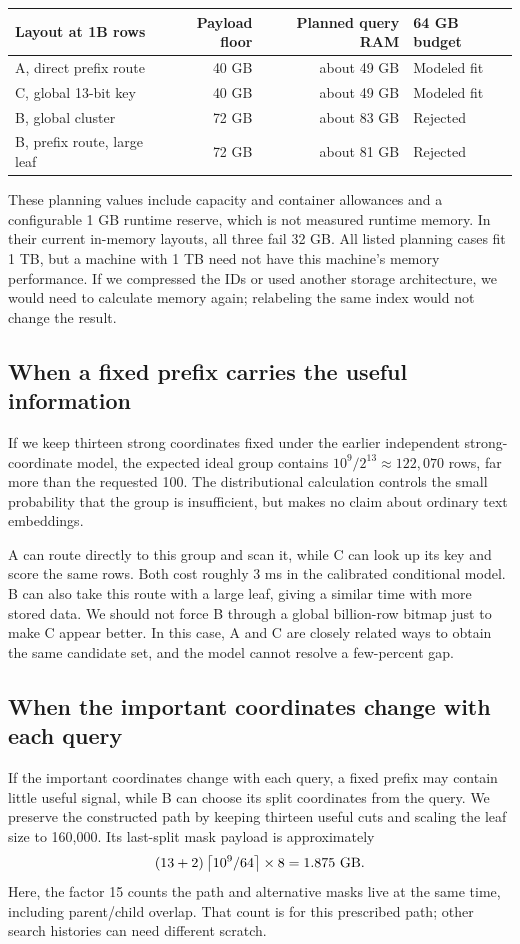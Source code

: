 \begin{center}
\begin{tabular}{@{}lrrl@{}}\toprule
Layout at 1B rows & Payload floor & Planned query RAM & 64 GB budget\\\midrule
A, direct prefix route & 40 GB & about 49 GB & Modeled fit\\
C, global 13-bit key & 40 GB & about 49 GB & Modeled fit\\
B, global cluster & 72 GB & about 83 GB & Rejected\\
B, prefix route, large leaf & 72 GB & about 81 GB & Rejected\\\bottomrule
\end{tabular}
\end{center}
These planning values include capacity and container allowances and a configurable 1 GB
runtime reserve, which is not measured runtime memory. In their current in-memory layouts,
all three fail 32 GB. All listed planning cases fit 1 TB, but a machine with 1 TB need not
have this machine's memory performance. If we compressed the IDs or used another storage
architecture, we would need to calculate memory again; relabeling the same index would not
change the result.

\subsection{When a fixed prefix carries the useful information}
If we keep thirteen strong coordinates fixed under the earlier independent strong-coordinate
model, the expected ideal group contains $10^9/2^{13}\approx122{,}070$ rows, far more than
the requested 100. The distributional calculation controls the small probability that the
group is insufficient, but makes no claim about ordinary text embeddings.

A can route directly to this group and scan it, while C can look up its key and score the
same rows. Both cost roughly 3 ms in the calibrated conditional model. B can also take this
route with a large leaf, giving a similar time with more stored data. We should not force B
through a global billion-row bitmap just to make C appear better. In this case, A and C are closely
related ways to obtain the same candidate set, and the model cannot resolve a few-percent gap.

\subsection{When the important coordinates change with each query}
If the important coordinates change with each query, a fixed prefix may contain little
useful signal, while B can choose its split coordinates from the query. We preserve the
constructed path by keeping thirteen useful cuts and scaling the leaf size to 160,000.
Its last-split mask payload is approximately
\[
(13+2)\ceil{10^9/64}\times8=1.875\ \text{GB}.
\]
Here, the factor 15 counts the path and alternative masks live at the same time, including
parent/child overlap. That count is for this prescribed path; other search histories can
need different scratch.


